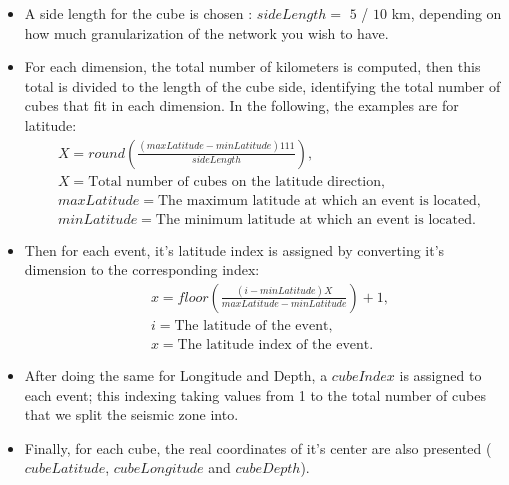 \begin{itemize}

	\item A side length for the cube is chosen : $sideLength = $ $5$ / $10$ km, depending on how much granularization of the network you wish to have.
	
	\item For each dimension, the total number of kilometers is computed\footnotemark,       then this total is divided to the length of the cube side, identifying the total number of cubes that fit in each dimension. In the following, the examples are for latitude:
	\begin{equation}
	\begin{split}
	&X = round(\frac{(maxLatitude-minLatitude)111}{sideLength}),  \\
	&X = \text{Total number of cubes on the latitude direction}, \\
	&maxLatitude = \text{The maximum latitude at which an event is located}, \\
	&minLatitude = \text{The minimum latitude at which an event is located}.	
	\end{split}
	\end{equation}
	
	

	\item Then for each event, it's latitude index is assigned by converting it's dimension to the corresponding index:
	\begin{equation}
	\begin{split}
	&x = floor(\frac{(i-minLatitude)X}{maxLatitude-minLatitude})+1, \\
	&i = \text{The latitude of the event}, \\
	&x = \text{The latitude index of the event}.
	\end{split}
	\end{equation}
	
	\item After doing the same for Longitude and Depth, a $cubeIndex$ is assigned to each event; this indexing taking values from 1 to the total number of cubes that we split the seismic zone into.
	
	\item Finally, for each cube, the real coordinates of it's center are also presented ($cubeLatitude$, $cubeLongitude$ and $cubeDepth$).
\end{itemize}

